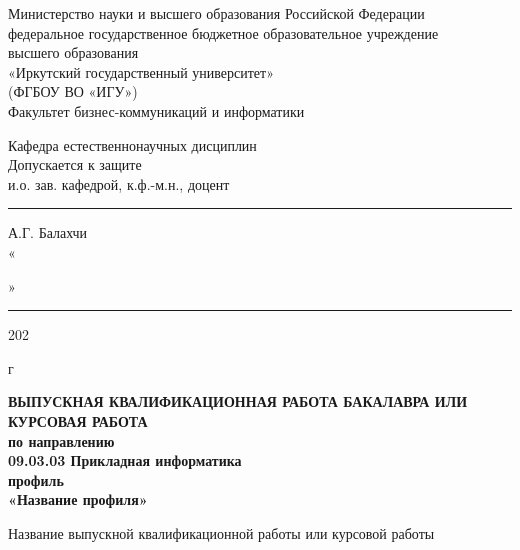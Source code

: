 \thispagestyle{titlepage} %
    \begin{center}
    \linespread{1}
		Министерство науки и высшего образования  Российской Федерации\\
федеральное государственное бюджетное образовательное учреждение\\
высшего образования\\
«Иркутский государственный университет»\\
(ФГБОУ ВО «ИГУ»)\\
Факультет бизнес-коммуникаций и информатики 
    \end{center}
\vspace{1cm}    
\hspace{8cm} 
\begin{minipage}{0.5\textwidth}
\linespread{1}

  \begin{flushleft}
	\small{
    Кафедра естественнонаучных дисциплин \\%
Допускается к защите \\
и.о. зав. кафедрой, к.ф.-м.н., доцент \\
\rule{2,1cm}{0,1pt} А.Г. Балахчи\\		
            «\rule{0,9cm}{0,1pt}»\rule{2,7cm}{0,1pt} 202\,\rule{0,2cm}{0,1pt} г \\		}
		
		
		\end{flushleft}
\end{minipage}


    \vspace{2cm} %
    \begin{center}
   {\bf ВЫПУСКНАЯ КВАЛИФИКАЦИОННАЯ РАБОТА БАКАЛАВРА ИЛИ КУРСОВАЯ РАБОТА\\
    по направлению  \\
		09.03.03 Прикладная информатика\\
		профиль\\
		«Название профиля»\\}
    \end{center}
		
    \begin{center}
  		Название выпускной квалификационной работы или курсовой работы\\
    \end{center}
		
